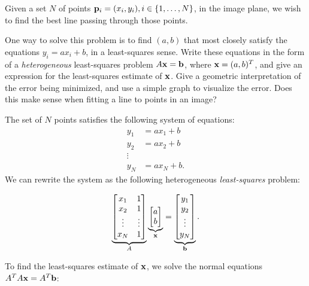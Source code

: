 \begin{problem}
  Given a set $N$ of points $\mathbf{p}_i = (x_i, y_i), i \in \left\{1, \ldots, N\right\}$,
  in the image plane, we wish to find the best line passing through those points.

  \begin{enumroman}
    \item One way to solve this problem is to find $(a, b)$ that most closely
      satisfy the equations $y_i = ax_i + b$, in a least-squares sense.
      Write these equations in the form of a \emph{heterogeneous}
      least-squares problem $A \mathbf{x} = \mathbf{b}$, where $\mathbf{x} = (a, b)^T$,
      and give an expression for the least-squares estimate of $\mathbf{x}$.
      Give a geometric interpretation of the error being minimized,
      and use a simple graph to visualize the error.
      Does this make sense when fitting a line to points in an image?
      \begin{answer}
        The set of $N$ points satisfies the following system of equations:
        \begin{align*}
          y_1 &= ax_1 + b \\
          y_2 &= ax_2 + b \\
          \vdots \\
          y_N &= ax_N + b.
        \end{align*}
        We can rewrite the system as the following heterogeneous
        \emph{least-squares} problem:

        \[
          \underbrace{\begin{bmatrix}
            x_1 & 1 \\
            x_2 & 1 \\
            \vdots & \vdots \\
            x_N & 1
          \end{bmatrix}}_{A}
          \underbrace{\begin{bmatrix}
            a \\
            b
          \end{bmatrix}}_{\mathbf{x}}
          =
          \underbrace{\begin{bmatrix}
            y_1 \\
            y_2 \\
            \vdots \\
            y_N
          \end{bmatrix}}_{\mathbf{b}}.
        \]

        To find the least-squares estimate of $\mathbf{x}$, we solve the
        normal equations $A^T A \mathbf{x} = A^T \mathbf{b}$:


\end{answer}
\end{enumroman}
\end{problem}
